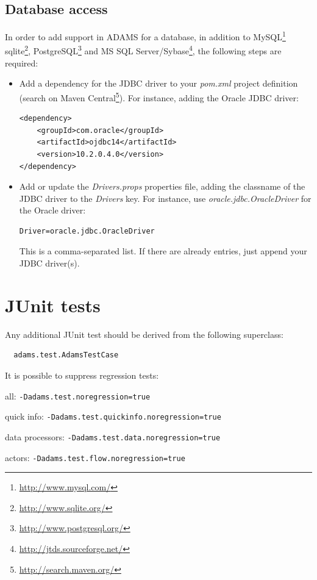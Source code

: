 \section{Database access}
In order to add support in ADAMS for a database, in addition to MySQL\footnote{\url{http://www.mysql.com/}{}} 
sqlite\footnote{\url{http://www.sqlite.org/}{}}, PostgreSQL\footnote{\url{http://www.postgresql.org/}{}}
and MS SQL Server/Sybase\footnote{\url{http://jtds.sourceforge.net/}{}}, the following steps are required:
\begin{itemize}
	\item Add a dependency for the JDBC driver to your \textit{pom.xml} project
	definition (search on Maven Central\footnote{\url{http://search.maven.org/}{}}). 
	For instance, adding the Oracle JDBC driver: \\
\begin{verbatim}
<dependency>
    <groupId>com.oracle</groupId>
    <artifactId>ojdbc14</artifactId>
    <version>10.2.0.4.0</version>
</dependency>
\end{verbatim}
	\item Add or update the \textit{Drivers.props} properties file, adding
	the classname of the JDBC driver to the \textit{Drivers} key. For instance,
	use \textit{oracle.jdbc.OracleDriver} for the Oracle driver: \\
\begin{verbatim}
Driver=oracle.jdbc.OracleDriver
\end{verbatim}
	This is a comma-separated list. If there are already entries, just append
	your JDBC driver(s).
\end{itemize}

\chapter{JUnit tests}
Any additional JUnit test should be derived from the following superclass:
\begin{verbatim}
  adams.test.AdamsTestCase
\end{verbatim}

It is possible to suppress regression tests:
\begin{tight_itemize}
	\item all: \texttt{-Dadams.test.noregression=true}
	\item quick info: \texttt{-Dadams.test.quickinfo.noregression=true}
	\item data processors: \texttt{-Dadams.test.data.noregression=true}
	\item actors: \texttt{-Dadams.test.flow.noregression=true}
\end{tight_itemize}

